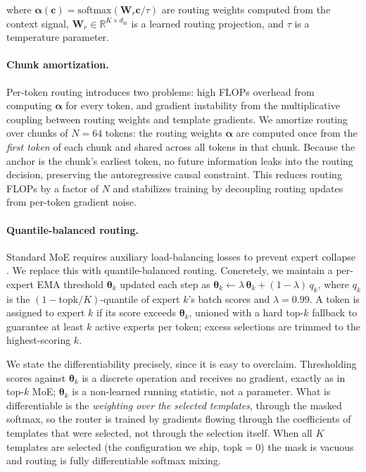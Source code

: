 \documentclass{article}
\begin{document}
\noindent where $\boldsymbol{\alpha}(\mathbf{c}) = \text{softmax}(\mathbf{W}_r \mathbf{c} / \tau)$ are routing weights computed from the context signal, $\mathbf{W}_r \in \mathbb{R}^{K \times d_\text{in}}$ is a learned routing projection, and $\tau$ is a temperature parameter.

\paragraph{Chunk amortization.} Per-token routing introduces two problems: high FLOPs overhead from computing $\boldsymbol{\alpha}$ for every token, and gradient instability from the multiplicative coupling between routing weights and template gradients. We amortize routing over chunks of $N{=}64$ tokens: the routing weights $\boldsymbol{\alpha}$ are computed once from the \emph{first token} of each chunk and shared across all tokens in that chunk. Because the anchor is the chunk's earliest token, no future information leaks into the routing decision, preserving the autoregressive causal constraint. This reduces routing FLOPs by a factor of $N$ and stabilizes training by decoupling routing updates from per-token gradient noise.

\paragraph{Quantile-balanced routing.}
Standard MoE requires auxiliary load-balancing losses to prevent expert collapse \citep{fedus2022switch}. We replace this with quantile-balanced routing. Concretely, we maintain a per-expert EMA threshold $\boldsymbol{\theta}_k$ updated each step as $\boldsymbol{\theta}_k \leftarrow \lambda\,\boldsymbol{\theta}_k + (1{-}\lambda)\,q_k$, where $q_k$ is the $(1 - \text{topk}/K)$-quantile of expert $k$'s batch scores and $\lambda{=}0.99$. A token is assigned to expert $k$ if its score exceeds $\boldsymbol{\theta}_k$, unioned with a hard top-$k$ fallback to guarantee at least $k$ active experts per token; excess selections are trimmed to the highest-scoring $k$.

We state the differentiability precisely, since it is easy to overclaim. Thresholding scores against $\boldsymbol{\theta}_k$ is a discrete operation and receives no gradient, exactly as in top-$k$ MoE; $\boldsymbol{\theta}_k$ is a non-learned running statistic, not a parameter. What is differentiable is the \emph{weighting over the selected templates}, through the masked softmax, so the router is trained by gradients flowing through the coefficients of templates that were selected, not through the selection itself. When all $K$ templates are selected (the configuration we ship, $\text{topk}{=}0$) the mask is vacuous and routing is fully differentiable softmax mixing.
\end{document}
